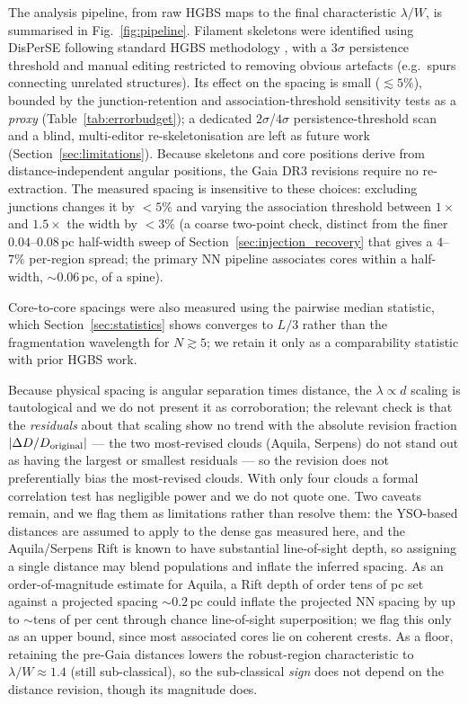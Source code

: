 \documentclass[usenatbib,twoside,twocolumn]{mnras}
\begin{document}
The analysis pipeline, from raw HGBS maps to the final characteristic $\lambda/W$, is summarised in Fig.~\ref{fig:pipeline}. Filament skeletons were identified using DisPerSE \citep{Sousbie2011} following standard HGBS methodology \citep{Arzoumanian2011}, with a $3\sigma$ persistence threshold and manual editing restricted to removing obvious artefacts (e.g.\ spurs connecting unrelated structures). Its effect on the spacing is small ($\lesssim5\%$), bounded by the junction-retention and association-threshold sensitivity tests as a \emph{proxy} (Table~\ref{tab:errorbudget}); a dedicated $2\sigma$/$4\sigma$ persistence-threshold scan and a blind, multi-editor re-skeletonisation are left as future work (Section~\ref{sec:limitations}). Because skeletons and core positions derive from distance-independent angular positions, the Gaia DR3 revisions require no re-extraction. The measured spacing is insensitive to these choices: excluding junctions changes it by $<5\%$ and varying the association threshold between $1\times$ and $1.5\times$ the width by $<3\%$ (a coarse two-point check, distinct from the finer $0.04$--$0.08$\,pc half-width sweep of Section~\ref{sec:injection_recovery} that gives a $4$--$7\%$ per-region spread; the primary NN pipeline associates cores within a half-width, $\sim0.06$\,pc, of a spine).

Core-to-core spacings were also measured using the pairwise median statistic, which Section~\ref{sec:statistics} shows converges to $L/3$ rather than the fragmentation wavelength for $N\gtrsim5$; we retain it only as a comparability statistic with prior HGBS work.

Because physical spacing is angular separation times distance, the $\lambda\propto d$ scaling is tautological and we do not present it as corroboration; the relevant check is that the \emph{residuals} about that scaling show no trend with the absolute revision fraction $|\Delta D/D_{\rm original}|$ --- the two most-revised clouds (Aquila, Serpens) do not stand out as having the largest or smallest residuals --- so the revision does not preferentially bias the most-revised clouds. With only four clouds a formal correlation test has negligible power and we do not quote one. Two caveats remain, and we flag them as limitations rather than resolve them: the YSO-based distances \citep{Zhang2023} are assumed to apply to the dense gas measured here, and the Aquila/Serpens Rift is known to have substantial line-of-sight depth, so assigning a single distance may blend populations and inflate the inferred spacing. As an order-of-magnitude estimate for Aquila, a Rift depth of order tens of pc set against a projected spacing $\sim0.2$\,pc could inflate the projected NN spacing by up to $\sim$tens of per cent through chance line-of-sight superposition; we flag this only as an upper bound, since most associated cores lie on coherent crests. As a floor, retaining the pre-Gaia distances lowers the robust-region characteristic to $\lambda/W\approx1.4$ (still sub-classical), so the sub-classical \emph{sign} does not depend on the distance revision, though its magnitude does.
\end{document}
